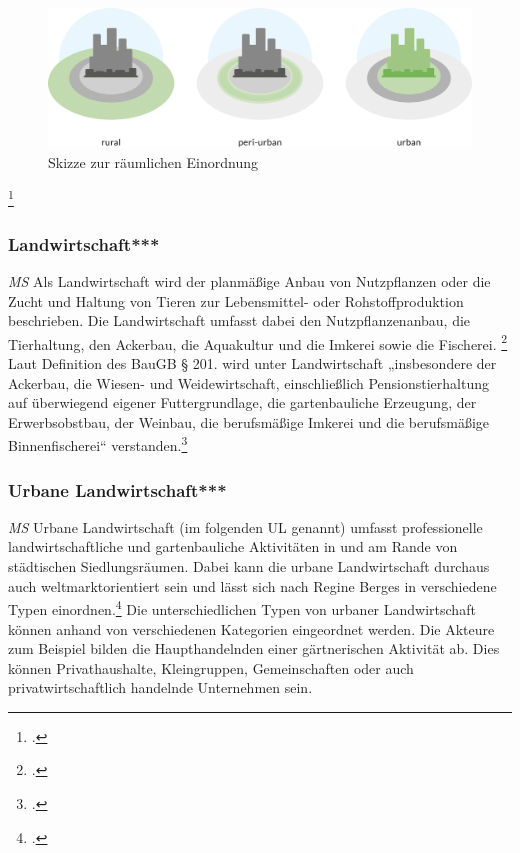 \documentclass{scrartcl}
\begin{document}
\begin{figure}[htbp]
\centering
\includegraphics[width=12cm]{image_folder/SchaubildUrbaneEingrenzungen.png}
\caption{Skizze zur räumlichen Einordnung}
\label{fig:ul_typologie}
\end{figure}
\footcite[]{Eigene Zeichnung, entstanden aus dem Vorbild von Carlos Tobisch, Oasen im Beton S.26, Abb.7}

\subsubsection{Landwirtschaft***}\textit{MS}
Als Landwirtschaft wird der planmäßige Anbau von Nutzpflanzen oder die Zucht und Haltung von Tieren zur Lebensmittel- oder Rohstoffproduktion beschrieben. Die Landwirtschaft umfasst dabei den Nutzpflanzenanbau, die Tierhaltung, den Ackerbau, die Aquakultur und die Imkerei sowie die Fischerei. \footcite[S. 5]{Lohrberg2001StadtnaheFreiraumplanung}  Laut Definition des BauGB § 201. wird unter Landwirtschaft „insbesondere der Ackerbau, die Wiesen- und Weidewirtschaft, einschließlich Pensionstierhaltung auf überwiegend eigener Futtergrundlage, die gartenbauliche Erzeugung, der Erwerbsobstbau, der Weinbau, die berufsmäßige Imkerei und die berufsmäßige Binnenfischerei“ verstanden.\footcite[§ 201]{}

\subsubsection[UL]{Urbane Landwirtschaft***}\textit{MS}
Urbane Landwirtschaft (im folgenden UL genannt) umfasst professionelle landwirtschaftliche und gartenbauliche Aktivitäten in und am Rande von städtischen Siedlungsräumen. Dabei kann die urbane Landwirtschaft durchaus auch weltmarktorientiert sein und lässt sich nach Regine Berges in verschiedene Typen einordnen.\footcite[]{} Die unterschiedlichen Typen von urbaner Landwirtschaft können anhand von verschiedenen Kategorien eingeordnet werden. Die Akteure zum Beispiel bilden die Haupthandelnden einer gärtnerischen Aktivität ab. Dies können Privathaushalte, Kleingruppen, Gemeinschaften oder auch privatwirtschaftlich handelnde Unternehmen sein. 
\end{document}
